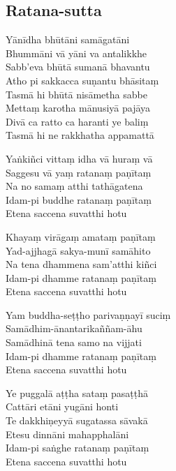 
\subsection{Ratana-sutta}



\bigskip

\begin{paritta}

Yānīdha bhūtāni samāgatāni\\
Bhummāni vā yāni va antalikkhe\\
Sabb'eva bhūtā sumanā bhavantu\\
Atho pi sakkacca suṇantu bhāsitaṃ\\
Tasmā hi bhūtā nisāmetha sabbe\\
Mettaṃ karotha mānusiyā pajāya\\
Divā ca ratto ca haranti ye baliṃ\\
Tasmā hi ne rakkhatha appamattā


\label{yankinci-vittam}
%
Yaṅkiñci vittaṃ idha vā huraṃ vā\\
Saggesu vā yaṃ ratanaṃ paṇītaṃ\\
Na no samaṃ atthi tathāgatena\\
Idam-pi buddhe ratanaṃ paṇītaṃ\\
Etena saccena suvatthi hotu

%
Khayaṃ virāgaṃ amataṃ paṇītaṃ\\
Yad-ajjhagā sakya-munī samāhito\\
Na tena dhammena sam'atthi kiñci\\
Idam-pi dhamme ratanaṃ paṇītaṃ\\
Etena saccena suvatthi hotu

%
Yam buddha-seṭṭho parivaṇṇayī suciṃ\\
Samādhim-ānantarikaññam-āhu\\
Samādhinā tena samo na vijjati\\
Idam-pi dhamme ratanaṃ paṇītaṃ\\
Etena saccena suvatthi hotu

%
Ye puggalā aṭṭha sataṃ pasaṭṭhā\\
Cattāri etāni yugāni honti\\
Te dakkhiṇeyyā sugatassa sāvakā\\
Etesu dinnāni mahapphalāni\\
Idam-pi saṅghe ratanaṃ paṇītaṃ\\
Etena saccena suvatthi hotu


\end{paritta}
